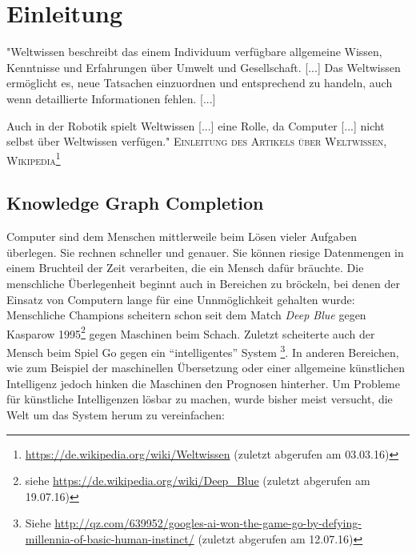 
\chapter{Einleitung} %

\label{Chapter1} %


\newcommand{\keyword}[1]{\textbf{#1}}
\newcommand{\tabhead}[1]{\textbf{#1}}
\newcommand{\code}[1]{\texttt{#1}}
\newcommand{\file}[1]{\texttt{\bfseries#1}}
\newcommand{\option}[1]{\texttt{\itshape#1}}


\begin{itquote}
"Weltwissen beschreibt das einem Individuum verfügbare allgemeine Wissen, Kenntnisse und Erfahrungen über Umwelt und Gesellschaft. [...]
Das Weltwissen ermöglicht es, neue Tatsachen einzuordnen und entsprechend zu handeln, auch wenn detaillierte Informationen fehlen. [...]

Auch in der Robotik spielt Weltwissen [...] eine Rolle,
da Computer [...] nicht selbst über Weltwissen verfügen."
\flushright
\textsc{Einleitung des Artikels über Weltwissen, Wikipedia\footnote{\url{https://de.wikipedia.org/wiki/Weltwissen} (zuletzt abgerufen am 03.03.16)}}
\end{itquote}

\section{Knowledge Graph Completion}

Computer sind dem Menschen mittlerweile beim Lösen vieler Aufgaben überlegen. Sie rechnen schneller und genauer.
Sie können riesige Datenmengen in einem Bruchteil der Zeit verarbeiten, die ein Mensch dafür bräuchte. Die menschliche
Überlegenheit beginnt auch in Bereichen zu bröckeln, bei denen der Einsatz von Computern lange für eine Unnmöglichkeit
gehalten wurde: Menschliche Champions scheitern schon seit dem Match \emph{Deep Blue} gegen Kasparow 1995\footnote{
siehe \url{https://de.wikipedia.org/wiki/Deep_Blue} (zuletzt abgerufen am 19.07.16)} gegen Maschinen beim Schach. Zuletzt
scheiterte auch der Mensch beim Spiel Go gegen ein ``intelligentes'' System
\footnote{Siehe \url{http://qz.com/639952/googles-ai-won-the-game-go-by-defying-millennia-of-basic-human-instinct/} (zuletzt abgerufen am 12.07.16)}.
In anderen Bereichen, wie zum Beispiel der maschinellen Übersetzung oder einer allgemeine künstlichen Intelligenz jedoch hinken die Maschinen den Prognosen hinterher.
Um Probleme für künstliche Intelligenzen lösbar zu machen, wurde bisher meist versucht, die Welt um das System herum zu vereinfachen:\\

